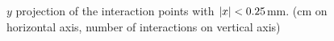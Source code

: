 \documentclass[a4paper]{article}
\begin{document}
\begin{figure}[H]
  \caption{$y$ projection of the interaction points with $\abs{x}<0.25$mm. (cm on horizontal axis, number of interactions on vertical axis)}
  \label{fig:2_all}
\end{figure}
\end{document}
